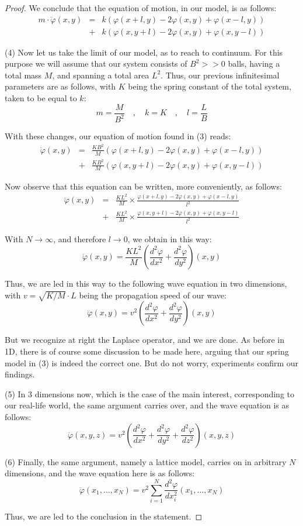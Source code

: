 \documentclass[12pt]{amsbook}
\begin{document}
\begin{proof}
We conclude that the equation of motion, in our model, is as follows:
\begin{eqnarray*}
m\cdot\ddot{\varphi}(x,y)
&=&k(\varphi(x+l,y)-2\varphi(x,y)+\varphi(x-l,y))\\
&+&k(\varphi(x,y+l)-2\varphi(x,y)+\varphi(x,y-l))
\end{eqnarray*}

(4) Now let us take the limit of our model, as to reach to continuum. For this purpose we will assume that our system consists of $B^2>>0$ balls, having a total mass $M$, and spanning a total area $L^2$. Thus, our previous infinitesimal parameters are as follows, with $K$ being the spring constant of the total system, taken to be equal to $k$:
$$m=\frac{M}{B^2}\quad,\quad k=K\quad,\quad l=\frac{L}{B}$$

With these changes, our equation of motion found in (3) reads:
\begin{eqnarray*}
\ddot{\varphi}(x,y)
&=&\frac{KB^2}{M}(\varphi(x+l,y)-2\varphi(x,y)+\varphi(x-l,y))\\
&+&\frac{KB^2}{M}(\varphi(x,y+l)-2\varphi(x,y)+\varphi(x,y-l))
\end{eqnarray*}

Now observe that this equation can be written, more conveniently, as follows:
\begin{eqnarray*}
\ddot{\varphi}(x,y)
&=&\frac{KL^2}{M}\times\frac{\varphi(x+l,y)-2\varphi(x,y)+\varphi(x-l,y)}{l^2}\\
&+&\frac{KL^2}{M}\times\frac{\varphi(x,y+l)-2\varphi(x,y)+\varphi(x,y-l)}{l^2}
\end{eqnarray*}

With $N\to\infty$, and therefore $l\to0$, we obtain in this way:
$$\ddot{\varphi}(x,y)=\frac{KL^2}{M}\left(\frac{d^2\varphi}{dx^2}+\frac{d^2\varphi}{dy^2}\right)(x,y)$$

Thus, we are led in this way to the following wave equation in two dimensions, with $v=\sqrt{K/M}\cdot L$ being the propagation speed of our wave:
$$\ddot{\varphi}(x,y)=v^2\left(\frac{d^2\varphi}{dx^2}+\frac{d^2\varphi}{dy^2}\right)(x,y)$$

But we recognize at right the Laplace operator, and we are done. As before in 1D, there is of course some discussion to be made here, arguing that our spring model in (3) is indeed the correct one. But do not worry, experiments confirm our findings.

\medskip

(5) In 3 dimensions now, which is the case of the main interest, corresponding to our real-life world, the same argument carries over, and the wave equation is as follows:
$$\ddot{\varphi}(x,y,z)=v^2\left(\frac{d^2\varphi}{dx^2}+\frac{d^2\varphi}{dy^2}+\frac{d^2\varphi}{dz^2}\right)(x,y,z)$$

(6) Finally, the same argument, namely a lattice model, carries on in arbitrary $N$ dimensions, and the wave equation here is as follows:
$$\ddot{\varphi}(x_1,\ldots,x_N)=v^2\sum_{i=1}^N\frac{d^2\varphi}{dx_i^2}(x_1,\ldots,x_N)$$

Thus, we are led to the conclusion in the statement.
\end{proof}
\end{document}
